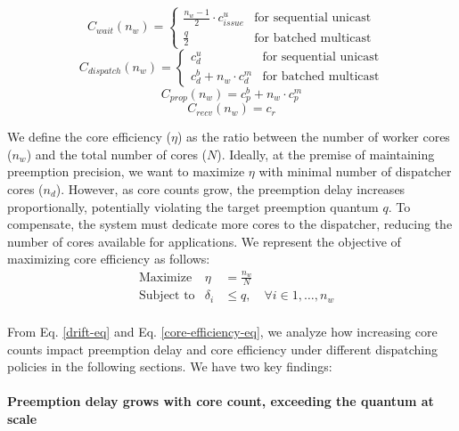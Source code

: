 \begin{equation}
C_{wait} (n_w) = \begin{cases}
\frac{n_w-1}{2} \cdot c_{issue}^{u} & \text{for sequential unicast} \\[8pt]
\frac{q}{2} & \text{for batched multicast}
\end{cases}
\end{equation}
\begin{equation}
C_{dispatch} (n_w) = \begin{cases}
c_{d}^{u} & \text{for sequential unicast} \\
c_{d}^{b} + n_w \cdot c_{d}^{m} & \text{for batched multicast}
\end{cases}
\end{equation}
\begin{equation}
C_{prop} (n_w) = c_{p}^{b} + n_w \cdot c_{p}^{m}
\end{equation}
\begin{equation}
C_{recv} (n_w) = c_{r}
\end{equation}

We define the core efficiency ($\eta$) as the ratio between the number of worker cores ($n_w$) and the total number of cores ($N$).
Ideally, at the premise of maintaining preemption precision, we want to maximize $\eta$ with minimal number of dispatcher cores ($n_d$).
However, as core counts grow, the preemption delay increases proportionally, potentially violating the target preemption quantum $q$.
To compensate, the system must dedicate more cores to the dispatcher, reducing the number of cores available for applications.
We represent the objective of maximizing core efficiency as follows:
\begin{equation} 
\begin{aligned} 
& \text{Maximize} & \eta & = \frac{n_w}{N} \\
& \text{Subject to} & \delta_i & \le q, \quad \forall i \in {1, \dots, n_w} \\
\end{aligned} 
\label{core-efficiency-eq}
\end{equation}

From Eq. \ref{drift-eq} and Eq. \ref{core-efficiency-eq}, we analyze how increasing core counts impact preemption delay and core efficiency under different dispatching policies in the following sections.
We have two key findings:
\paragraph{Preemption delay grows with core count, exceeding the quantum at scale}
